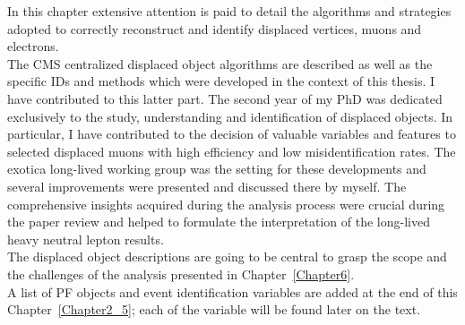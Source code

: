In this chapter extensive attention is paid 
to detail the algorithms and strategies adopted to
correctly reconstruct and identify displaced vertices, muons and
electrons. \\
The CMS centralized displaced object algorithms are
described as well as the specific IDs and methods which were developed in
the context of this thesis. I have contributed to this latter part. The second year of my PhD was dedicated
exclusively to the study, understanding and identification of
displaced objects. In particular, I have contributed to the
decision of valuable variables and features to selected displaced muons with
high efficiency and low misidentification rates. The exotica long-lived working group was the
setting for these developments and several improvements were presented
and discussed there by myself. The comprehensive
insights acquired during the analysis process were crucial during the
paper review and helped to formulate the interpretation of the
long-lived heavy neutral lepton results.\\
The displaced object descriptions are going to be central to grasp the
scope and the challenges of the analysis presented in
Chapter~\ref{Chapter6}. \\

A list of PF objects and event identification variables are added at
the end of this Chapter~\ref{Chapter2_5}; each of the variable will be found later on
the text.